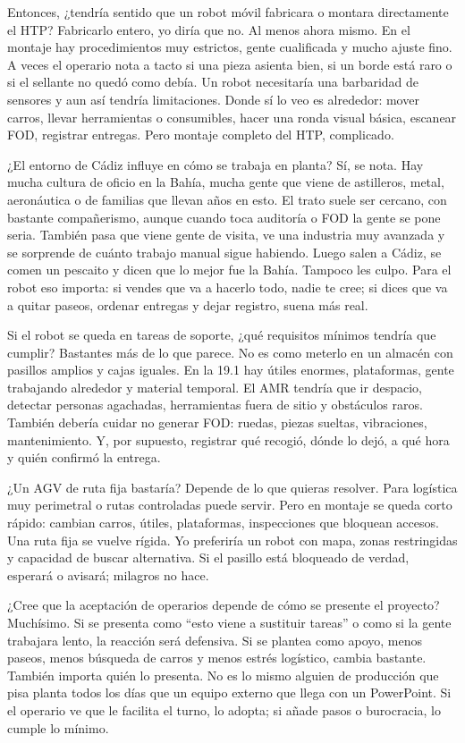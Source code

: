 \begin{interviewtranscript}
\InterviewExchange
{Entonces, ¿tendría sentido que un robot móvil fabricara o montara directamente el HTP?}
{Fabricarlo entero, yo diría que no. Al menos ahora mismo. En el montaje hay procedimientos muy estrictos, gente cualificada y mucho ajuste fino. A veces el operario nota a tacto si una pieza asienta bien, si un borde está raro o si el sellante no quedó como debía. Un robot necesitaría una barbaridad de sensores y aun así tendría limitaciones. Donde sí lo veo es alrededor: mover carros, llevar herramientas o consumibles, hacer una ronda visual básica, escanear FOD, registrar entregas. Pero montaje completo del HTP, complicado.}

\InterviewExchange
{¿El entorno de Cádiz influye en cómo se trabaja en planta?}
{Sí, se nota. Hay mucha cultura de oficio en la Bahía, mucha gente que viene de astilleros, metal, aeronáutica o de familias que llevan años en esto. El trato suele ser cercano, con bastante compañerismo, aunque cuando toca auditoría o FOD la gente se pone seria. También pasa que viene gente de visita, ve una industria muy avanzada y se sorprende de cuánto trabajo manual sigue habiendo. Luego salen a Cádiz, se comen un pescaito y dicen que lo mejor fue la Bahía. Tampoco les culpo. Para el robot eso importa: si vendes que va a hacerlo todo, nadie te cree; si dices que va a quitar paseos, ordenar entregas y dejar registro, suena más real.}

\InterviewExchange
{Si el robot se queda en tareas de soporte, ¿qué requisitos mínimos tendría que cumplir?}
{Bastantes más de lo que parece. No es como meterlo en un almacén con pasillos amplios y cajas iguales. En la 19.1 hay útiles enormes, plataformas, gente trabajando alrededor y material temporal. El AMR tendría que ir despacio, detectar personas agachadas, herramientas fuera de sitio y obstáculos raros. También debería cuidar no generar FOD: ruedas, piezas sueltas, vibraciones, mantenimiento. Y, por supuesto, registrar qué recogió, dónde lo dejó, a qué hora y quién confirmó la entrega.}

\InterviewExchange
{¿Un AGV de ruta fija bastaría?}
{Depende de lo que quieras resolver. Para logística muy perimetral o rutas controladas puede servir. Pero en montaje se queda corto rápido: cambian carros, útiles, plataformas, inspecciones que bloquean accesos. Una ruta fija se vuelve rígida. Yo preferiría un robot con mapa, zonas restringidas y capacidad de buscar alternativa. Si el pasillo está bloqueado de verdad, esperará o avisará; milagros no hace.}

\InterviewExchange
{¿Cree que la aceptación de operarios depende de cómo se presente el proyecto?}
{Muchísimo. Si se presenta como ``esto viene a sustituir tareas'' o como si la gente trabajara lento, la reacción será defensiva. Si se plantea como apoyo, menos paseos, menos búsqueda de carros y menos estrés logístico, cambia bastante. También importa quién lo presenta. No es lo mismo alguien de producción que pisa planta todos los días que un equipo externo que llega con un PowerPoint. Si el operario ve que le facilita el turno, lo adopta; si añade pasos o burocracia, lo cumple lo mínimo.}


\end{interviewtranscript}
